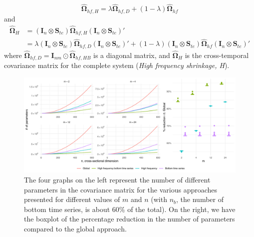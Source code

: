 \documentclass[a4paper,11pt]{article}
\newcommand{\Ivet}{\bm{I}}
\newcommand{\Svet}{\bm{S}}
\newcommand{\Omegavet}{\bm{\Omega}}
\theoremstyle{definition}
\begin{document}
$$
\widehat{\Omegavet}_{hf, H} = \lambda \widehat{\Omegavet}_{hf, D} + (1-\lambda) \widehat{\Omegavet}_{hf}
$$
and
\begin{align*}
	\widehat{\Omegavet}_{H} & = (\Ivet_{n} \otimes \Svet_{te})\widehat{\Omegavet}_{hf, H} (\Ivet_{n} \otimes \Svet_{te})'\\
	& = \lambda (\Ivet_{n} \otimes \Svet_{te})\widehat{\Omegavet}_{hf, D}(\Ivet_{n} \otimes \Svet_{te})' + (1-\lambda) (\Ivet_{n} \otimes \Svet_{te})\widehat{\Omegavet}_{hf}(\Ivet_{n} \otimes \Svet_{te})'
\end{align*}
where $\widehat{\Omegavet}_{hf, D} = \Ivet_{nm}\odot\widehat{\Omegavet}_{hf, HB}$ is a diagonal matrix, and $\widehat{\Omegavet}_{H}$ is the cross-temporal covariance matrix for the complete system (\textit{High frequency shrinkage, H}).

\begin{figure}[t]
\centering
\includegraphics[width = \linewidth]{fig/shr_cov/parameters.pdf}
\caption{The four graphs on the left represent the number of different parameters in the covariance matrix for the various approaches presented for different values of $m$ and $n$ (with $n_b$, the number of bottom time series, is about $60\%$ of the total). On the right, we have the boxplot of the percentage reduction in the number of parameters compared to the global approach.}
\label{fig:num_param}
\end{figure}
\end{document}
